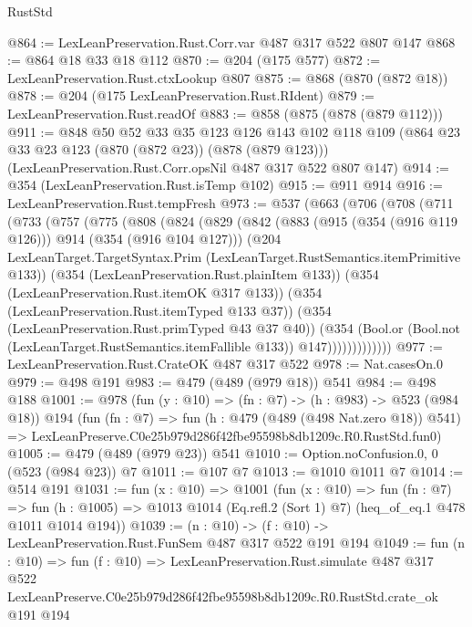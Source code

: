 \begin{lexlean}{RustStd}
\begin{coremodule}
@864 := LexLeanPreservation.Rust.Corr.var @487 @317 @522 @807 @147
@868 := @864 @18 @33 @18 @112
@870 := @204 (@175 @577)
@872 := LexLeanPreservation.Rust.ctxLookup @807
@875 := @868 (@870 (@872 @18))
@878 := @204 (@175 LexLeanPreservation.Rust.RIdent)
@879 := LexLeanPreservation.Rust.readOf
@883 := @858 (@875 (@878 (@879 @112)))
@911 := @848
    @50
    @52
    @33
    @35
    @123
    @126
    @143
    @102
    @118
    @109
    (@864 @23 @33 @23 @123 (@870 (@872 @23)) (@878 (@879 @123)))
    (LexLeanPreservation.Rust.Corr.opsNil @487 @317 @522 @807 @147)
@914 := @354 (LexLeanPreservation.Rust.isTemp @102)
@915 := @911 @914
@916 := LexLeanPreservation.Rust.tempFresh
@973 := @537
    (@663
      (@706
        (@708
          (@711
            (@733
              (@757
                (@775
                  (@808
                    (@824
                      (@829
                        (@842
                          (@883 (@915 (@354 (@916 @119 @126))) @914 (@354 (@916 @104 @127)))
                          (@204
                            LexLeanTarget.TargetSyntax.Prim
                            (LexLeanTarget.RustSemantics.itemPrimitive @133))
                          (@354 (LexLeanPreservation.Rust.plainItem @133))
                          (@354 (LexLeanPreservation.Rust.itemOK @317 @133))
                          (@354 (LexLeanPreservation.Rust.itemTyped @133 @37))
                          (@354 (LexLeanPreservation.Rust.primTyped @43 @37 @40))
                          (@354
                            (Bool.or
                              (Bool.not (LexLeanTarget.RustSemantics.itemFallible @133))
                              @147)))))))))))))
@977 := LexLeanPreservation.Rust.CrateOK @487 @317 @522
@978 := Nat.casesOn.{0}
@979 := @498 @191
@983 := @479 (@489 (@979 @18)) @541
@984 := @498 @188
@1001 := @978
    (fun (y : @10) => (fn : @7) -> (h : @983) -> @523 (@984 @18))
    @194
    (fun (fn : @7) =>
    fun (h : @479 (@489 (@498 Nat.zero @18)) @541) =>
    LexLeanPreserve.C0e25b979d286f42fbe95598b8db1209c.R0.RustStd.fun0)
@1005 := @479 (@489 (@979 @23)) @541
@1010 := Option.noConfusion.{0, 0} (@523 (@984 @23)) @7
@1011 := @107 @7
@1013 := @1010 @1011 @7
@1014 := @514 @191
@1031 := fun (x : @10) =>
  @1001
    (fun (x : @10) =>
    fun (fn : @7) =>
    fun (h : @1005) => @1013 @1014 (Eq.refl.{2} (Sort 1) @7) (heq_of_eq.{1} @478 @1011 @1014 @194))
@1039 := (n : @10) -> (f : @10) -> LexLeanPreservation.Rust.FunSem @487 @317 @522 @191 @194
@1049 := fun (n : @10) =>
  fun (f : @10) =>
  LexLeanPreservation.Rust.simulate
    @487
    @317
    @522
    LexLeanPreserve.C0e25b979d286f42fbe95598b8db1209c.R0.RustStd.crate_ok
    @191
    @194
\end{coremodule}
\end{lexlean}
